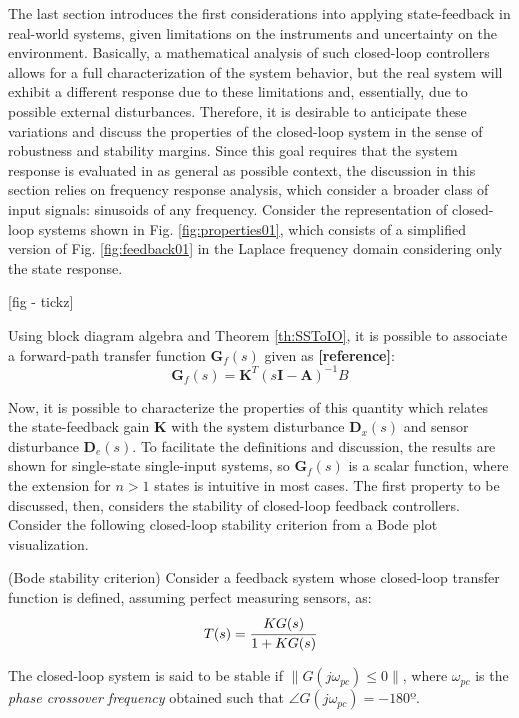 \documentclass[a4paper,11pt]{book}
\numberwithin{figure}{chapter}
\numberwithin{equation}{chapter}
\numberwithin{table}{chapter}
\newtheorem{theorem}{Theorem}[chapter]
\theoremstyle{definition}
\newcounter{boxed-theorem}
\newenvironment{boxed-theorem}[1]
{\begin{shaded} \begin{theorem}{#1}}
{\end{theorem} \end{shaded}}
\newcounter{boxed-definition}
\begin{document}
The last section introduces the first considerations into applying state-feedback in real-world systems, given limitations on the instruments and uncertainty on the environment. Basically, a mathematical analysis of such closed-loop controllers allows for a full characterization of the system behavior, but the real system will exhibit a different response due to these limitations and, essentially, due to possible external disturbances. Therefore, it is desirable to anticipate these variations and discuss the properties of the closed-loop system in the sense of robustness and stability margins. Since this goal requires that the system response is evaluated in as general as possible context, the discussion in this section relies on frequency response analysis, which consider a broader class of input signals: sinusoids of any frequency. Consider the representation of closed-loop systems shown in Fig. \ref{fig:properties01}, which consists of a simplified version of Fig. \ref{fig:feedback01} in the Laplace frequency domain considering only the state response.

[fig - tickz]

Using block diagram algebra and Theorem \ref{th:SSToIO}, it is possible to associate a forward-path transfer function $\bm{G}_{f}(s)$ given as \textbf{[reference]}:
\begin{equation} \label{eq:fdbckForwardTrnsfer}
	\bm{G}_{f}(s) =  \bm{K}^{T} \left(s \bm{I} - \bm{A} \right)^{-1} B 
\end{equation}

Now, it is possible to characterize the properties of this quantity which relates the state-feedback gain $\bm{K}$ with the system disturbance $\bm{D}_x(s)$ and sensor disturbance $\bm{D}_e(s)$. To facilitate the definitions and discussion, the results are shown for single-state single-input systems, so $\bm{G}_f(s)$ is a scalar function, where the extension for $n > 1$ states is intuitive in most cases. The first property to be discussed, then, considers the stability of closed-loop feedback controllers. Consider the following closed-loop stability criterion from a Bode plot visualization.

\begin{boxed-theorem}{(Bode stability criterion)}
    Consider a feedback system whose closed-loop transfer function is defined, assuming perfect measuring sensors, as:
    \begin{equation}
        T(s) = \cfrac{K G(s)}{1 + K G(s)}
    \end{equation}
    
    The closed-loop system is said to be stable if $\| G(j \omega_{pc}) \leq 0 \|$, where $\omega_{pc}$ is the \textit{phase crossover frequency} obtained such that $\angle G(j \omega_{pc}) = -180º$.
\end{boxed-theorem}
\end{document}
